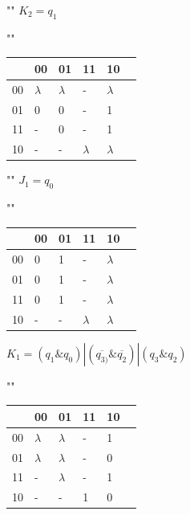 \begin{center}
	""\newline\newline
	$K_{2} = q_{1}$
	
	""\newline
	\begin{tabular}{ | l | l | l | l | l | p{1cm} |}
		\hline
		\diagbox[width=5em]{$q_{3}q_{2}$}{$q_{1}q_{0}$} & 00 & 01 & 11 & 10 \\\hline
		00 & $\lambda$  & $\lambda$  & \cellcolor{blue!25} - & \cellcolor{blue!25} $\lambda$  \\\hline
		01 & 0 & 0 & \cellcolor{blue!25} - & \cellcolor{blue!25} 1 \\ \hline
		11 & - &  0 & \cellcolor{blue!25} - &  \cellcolor{blue!25} 1  \\ \hline
		10 & - & - & \cellcolor{blue!25} \cellcolor{blue!25} $\lambda$  & \cellcolor{blue!25} $\lambda$  \\ 
		\hline
	\end{tabular}

	""\newline\newline
	$J_{1} = q_{0}$
	
	""\newline
	\begin{tabular}{ | l | l | l | l | l | p{1cm} |}
		\hline
		\diagbox[width=5em]{$q_{3}q_{2}$}{$q_{1}q_{0}$} & 00 & 01 & 11 & 10 \\\hline
		00 & 0  & \cellcolor{blue!25} 1  & \cellcolor{blue!25} - & $\lambda$  \\\hline
		01 & 0  & \cellcolor{blue!25} 1  & \cellcolor{blue!25} - & $\lambda$  \\\hline
		11 & 0  & \cellcolor{blue!25} 1  & \cellcolor{blue!25} - & $\lambda$  \\\hline
		10 & -  & \cellcolor{blue!25} - & \cellcolor{blue!25} $\lambda$  & $\lambda$  \\ 
		\hline
	\end{tabular}

	\clearpage
	$K_{1} = (q_{1} \& q_{0}) | (\overline{q_{3)}} \& \overline{q_{2}}) | (q_{3} \& q_{2})$
	
	""\newline
	\begin{tabular}{ | l | l | l | l | l | p{1cm} |}
		\hline
		\diagbox[width=5em]{$q_{3}q_{2}$}{$q_{1}q_{0}$} & 00 & 01 & 11 & 10 \\\hline
		00 & \cellcolor{blue!25} $\lambda$  & \cellcolor{blue!25} $\lambda$  & \cellcolor{blue!25} - & \cellcolor{blue!25} 1  \\\hline
		01 & $\lambda$  &  $\lambda$  & \cellcolor{blue!25} - & 0  \\\hline
		11 & \cellcolor{blue!25} -  & \cellcolor{blue!25} $\lambda$  & \cellcolor{blue!25} - & \cellcolor{blue!25} 1  \\\hline
		10 & -  & - & \cellcolor{blue!25} 1  & 0  \\ 
		\hline
	\end{tabular}


\end{center}
